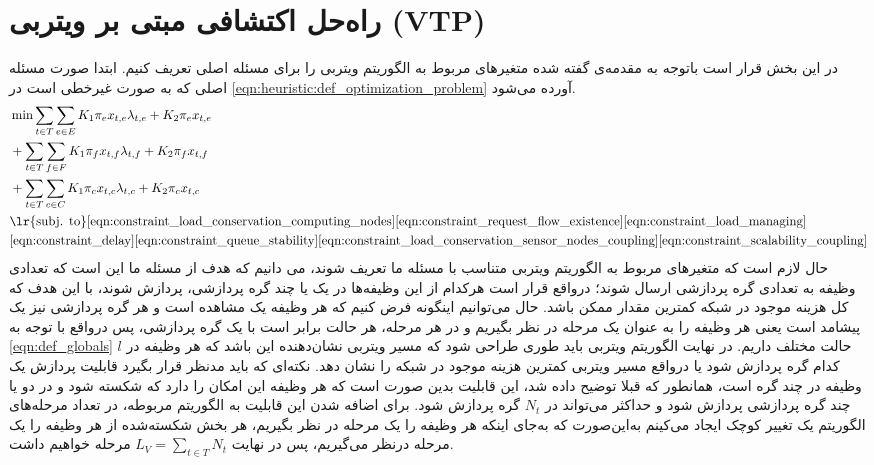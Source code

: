 \section{راه‌حل اکتشافی مبتی بر ویتربی (VTP)}	\label{subsection:vtp}
	در این بخش قرار است باتوجه به مقدمه‌ی گفته شده متغیرهای مربوط به الگوریتم ویتربی را برای مسئله اصلی تعریف کنیم. 
	ابتدا صورت مسئله اصلی که به صورت غیرخطی است در \cref{eqn:heuristic:def_optimization_problem} آورده می‌شود. 
	\begin{align}\label{eqn:heuristic:def_optimization_problem}
		& \min \sum_{t \in T}\sum_{e \in E} K_1\pi_ex_{t,e}\lambda_{t,e} + K_2\pi_ex_{t,e} \notag \\
		& + \sum_{t \in T}\sum_{f \in F} K_1\pi_fx_{t,f}\lambda_{t,f} + K_2\pi_fx_{t,f} \notag \\
		& + \sum_{t \in T}\sum_{c \in C} K_1\pi_cx_{t,c}\lambda_{t,c} + K_2\pi_cx_{t,c} \notag \\
		&\text{\lr{subj. to}}  %
		\cref{eqn:constraint_load_conservation_computing_nodes}
		\cref{eqn:constraint_request_flow_existence}
		\cref{eqn:constraint_load_managing}\notag \\
		&\cref{eqn:constraint_delay}
		\cref{eqn:constraint_queue_stability}
		\cref{eqn:constraint_load_conservation_sensor_nodes_coupling}
		\cref{eqn:constraint_scalability_coupling}
	\end{align}
	حال لازم است که متغیرهای مربوط به الگوریتم ویتربی متناسب با مسئله‌ ما تعریف شوند، می دانیم که هدف از مسئله ما این است که تعدادی وظیفه به تعدادی گره پردازشی ارسال شوند؛ درواقع قرار است هرکدام از این وظیفه‌ها در یک یا چند گره پردازشی، پردازش شوند، با این هدف که کل هزینه موجود در شبکه کمترین مقدار ممکن باشد. حال می‌توانیم اینگونه فرض کنیم که هر وظیفه یک مشاهده است و هر گره پردازشی نیز یک پیشامد است یعنی هر وظیفه را به عنوان یک مرحله در نظر بگیریم و در هر مرحله، هر حالت برابر است با یک گره پردازشی، پس درواقع با توجه به \cref{eqn:def_globals} $l$ حالت مختلف داریم. در نهایت الگوریتم ویتربی باید طوری طراحی شود که مسیر ویتربی نشان‌دهنده این باشد که هر وظیفه در کدام گره پردازش شود یا درواقع مسیر ویتربی کمترین هزینه موجود در شبکه را نشان دهد.
	نکته‌ای که باید مدنظر قرار بگیرد قابلیت پردازش یک وظیفه در چند گره است، همانطور که قبلا توضیح داده شد، این قابلیت بدین صورت است که هر وظیفه این امکان را دارد که شکسته شود و در دو یا چند گره پردازشی پردازش شود و حداکثر می‌تواند در $N_t$ گره پردازش شود. 
	برای اضافه شدن این قابلیت به الگوریتم مربوطه، در تعداد مرحله‌های الگوریتم یک تغییر کوچک ایجاد می‌کینم به‌این‌صورت که به‌جای اینکه هر وظیفه را یک مرحله در نظر بگیریم، هر بخش شکسته‌شده از هر وظیفه را یک مرحله درنظر می‌گیریم، پس در نهایت $ \displaystyle L_V=\sum_{t \in T} N_t$ مرحله خواهیم داشت. 
